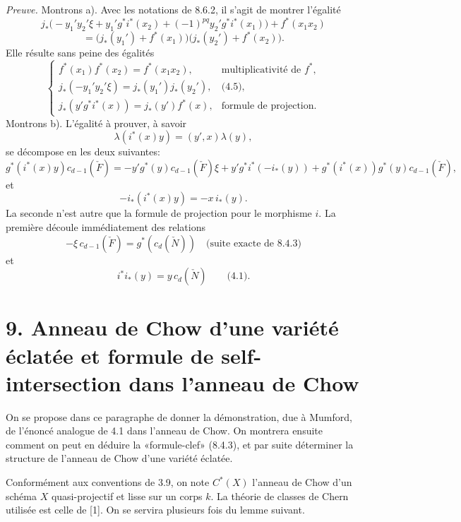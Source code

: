\documentclass[11pt]{article}
\begin{document}
\emph{Preuve.} Montrons a). Avec les notations de 8.6.2, il s'agit de montrer l'égalité
\[
j_*\bigl(-y_1'y_2'\xi+y_1'g^*i^*(x_2)+(-1)^{pq}y_2'g^*i^*(x_1)\bigr)+f^*(x_1x_2)
\]
\[
=\bigl(j_*(y_1')+f^*(x_1)\bigr)\bigl(j_*(y_2')+f^*(x_2)\bigr).
\]
Elle résulte sans peine des égalités
\[
\begin{cases}
f^*(x_1)f^*(x_2)=f^*(x_1x_2),&\text{multiplicativité de }f^*,\\
j_*(-y_1'y_2'\xi)=j_*(y_1')j_*(y_2'),&\text{(4.5)},\\
j_*(y'g^*i^*(x))=j_*(y')f^*(x),&\text{formule de projection}.
\end{cases}
\]
Montrons b). L'égalité à prouver, à savoir
\[
\lambda(i^*(x)y)=(y',x)\lambda(y),
\]
se décompose en les deux suivantes:
\[
g^*(i^*(x)y)c_{d-1}(\check F)
=
-y'g^*(y)c_{d-1}(\check F)\xi
+y'g^*i^*(-i_*(y))
+g^*(i^*(x))g^*(y)c_{d-1}(\check F),
\]
et
\[
-i_*(i^*(x)y)=-x\,i_*(y).
\]
La seconde n'est autre que la formule de projection pour le morphisme $i$. La première découle immédiatement des relations
\[
-\xi\,c_{d-1}(\check F)=g^*(c_d(\check N))
\quad\text{(suite exacte de 8.4.3)}
\]
et
\[
i^*i_*(y)=y\,c_d(\check N)\qquad\text{(4.1)}.
\]

\section*{9. Anneau de Chow d'une variété éclatée et formule de self-intersection dans l'anneau de Chow}

On se propose dans ce paragraphe de donner la démonstration, due à Mumford, de l'énoncé analogue de 4.1 dans l'anneau de Chow. On montrera ensuite comment on peut en déduire la «formule-clef» (8.4.3), et par suite déterminer la structure de l'anneau de Chow d'une variété éclatée.

Conformément aux conventions de 3.9, on note $C^*(X)$ l'anneau de Chow d'un schéma $X$ quasi-projectif et lisse sur un corps $k$. La théorie de classes de Chern utilisée est celle de [1]. On se servira plusieurs fois du lemme suivant.
\end{document}
